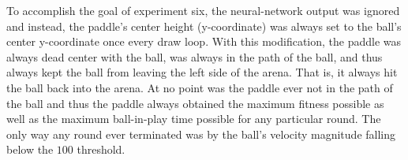 \documentclass[a4paper,10pt]{article}
\begin{document}
To accomplish the goal of experiment six, the neural-network output was ignored and instead, the paddle's center height (y-coordinate) was always set to the ball's center y-coordinate once every draw loop. With this modification, the paddle was always dead center with the ball, was always in the path of the ball, and thus always kept the ball from leaving the left side of the arena. That is, it always hit the ball back into the arena. At no point was the paddle ever not in the path of the ball and thus the paddle always obtained the maximum fitness possible as well as the maximum ball-in-play time possible for any particular round. The only way any round ever terminated was by the ball's velocity magnitude falling below the $100$ threshold.  

\end{document}
